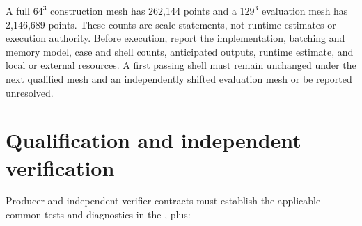\documentclass[11pt]{article}
\begin{document}
A full $64^3$ construction mesh has 262,144 points and a $129^3$ evaluation mesh has
2,146,689 points.  These counts are scale statements, not runtime estimates or execution
authority.  Before execution, report the implementation, batching and memory model,
case and shell counts, anticipated outputs, runtime estimate, and local or external
resources.  A first passing shell must remain unchanged under the next qualified mesh
and an independently shifted evaluation mesh or be reported unresolved.

\section{Qualification and independent verification}

Producer and independent verifier contracts must establish the applicable common tests
and diagnostics in the
,
plus:
\end{document}

